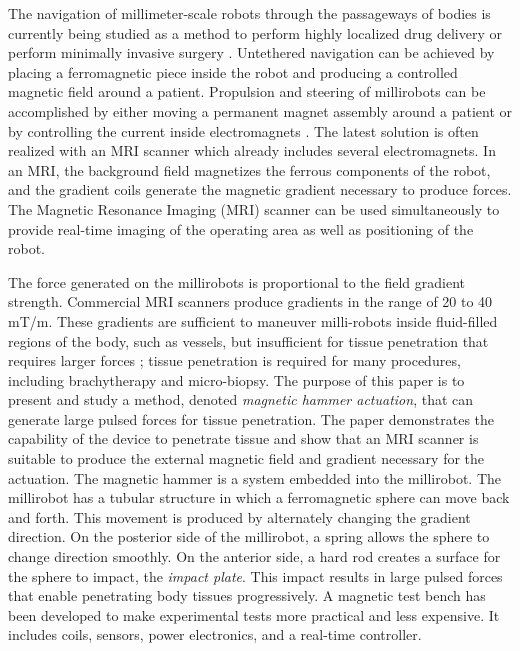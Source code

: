 \documentclass[letterpaper, 10 pt, conference]{ieeeconf}  %
\begin{document}
The navigation of millimeter-scale robots through the passageways of bodies is currently being studied as a method to perform highly localized drug delivery or perform minimally invasive surgery \cite{7067029,702,mi2020295}. Untethered navigation can be achieved by placing a ferromagnetic piece inside the robot and producing a controlled magnetic field around a patient. Propulsion and steering of millirobots can be accomplished by either moving a permanent magnet assembly around a patient \cite{taylor} or by controlling the current inside electromagnets \cite{MRM21638}. The latest solution is often realized with an MRI scanner which already includes several electromagnets. In an MRI, the background field magnetizes the ferrous components of the robot, and the gradient coils generate the magnetic gradient necessary to produce forces. 
The Magnetic Resonance Imaging (MRI) scanner can be used simultaneously to provide real-time imaging of the operating area as well as positioning of the robot.\par
The force generated on the millirobots is proportional to the field gradient strength. 
Commercial MRI scanners produce gradients in the range of 20 to 40 mT/m. 
These gradients are sufficient to maneuver milli-robots inside fluid-filled regions of the body, such as vessels, \cite{martel2007automatic} but insufficient for tissue penetration that requires larger forces \cite{7139341}; tissue penetration is required for many procedures, including brachytherapy and micro-biopsy.
The purpose of this paper is to present and study a method, denoted  \emph{magnetic hammer actuation}, that can generate large pulsed forces for tissue penetration. The paper demonstrates the capability of the device to penetrate tissue and show that an MRI scanner is suitable to produce the external magnetic field and gradient necessary for the actuation.
The magnetic hammer is a system embedded into the millirobot. 
The millirobot has a tubular structure in which a ferromagnetic sphere can move back and forth.
 This movement is produced by alternately changing the gradient direction. 
 On the posterior side of the millirobot, a spring allows the sphere to change direction smoothly. 
 On the anterior side, a hard rod creates a surface for the sphere to impact, the \emph{impact plate}.
  This impact results in large pulsed forces that enable penetrating body tissues progressively.
A magnetic test bench has been developed to make experimental tests more practical and less expensive.
 It includes coils, sensors, power electronics, and a real-time controller.\par
\end{document}
